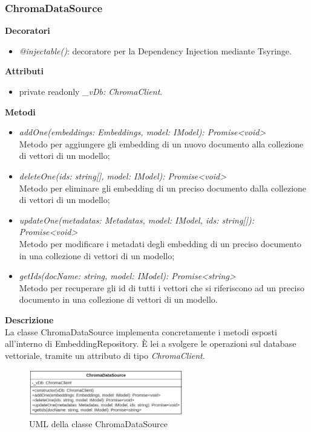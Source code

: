 \newpage

\subsubsection{ChromaDataSource}
\textbf{Decoratori}
\begin{itemize}
    \item \textit{@injectable()}: decoratore per la Dependency Injection mediante Tsyringe.
\end{itemize}
\textbf{Attributi}
\begin{itemize}
    \item private readonly \textit{\_vDb: ChromaClient}.
\end{itemize}
\textbf{Metodi}
\begin{itemize}[itemsep=-4pt]
    \item \textit{addOne(embeddings: Embeddings, model: IModel): Promise<void>}\\
    Metodo per aggiungere gli embedding di un nuovo documento alla collezione di vettori di un modello;
    \item \textit{deleteOne(ids: string[], model: IModel): Promise<void>}\\
    Metodo per eliminare gli embedding di un preciso documento dalla collezione di vettori di un modello;
    \item \textit{updateOne(metadatas: Metadatas, model: IModel, ids: string[]): Promise<void>}\\
    Metodo per modificare i metadati degli embedding di un preciso documento in una collezione di vettori di un modello;
    \item\textit{getIds(docName: string, model: IModel): Promise<string>}\\
    Metodo per recuperare gli id di tutti i vettori che si riferiscono ad un preciso documento in una collezione di vettori di un modello.
\end{itemize}
\textbf{Descrizione}\\
La classe ChromaDataSource implementa concretamente i metodi esposti all'interno di EmbeddingRepository. È lei a svolgere le operazioni sul database vettoriale, tramite un attributo di tipo \textit{ChromaClient}.

\begin{figure}[h!]
    \centering  
    \includegraphics[width=0.6\textwidth]{ChromaDataSource.png}
    \caption{UML della classe ChromaDataSource}
\end{figure}

